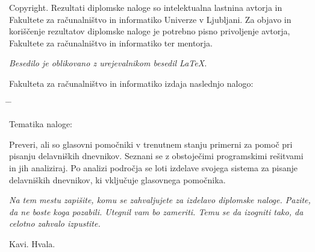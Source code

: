 \documentclass[a4paper, 12pt]{book}
\newcommand{\clearemptydoublepage}{\newpage{\pagestyle{empty}\cleardoublepage}}
\begin{document}
\noindent
{\sc Copyright}. 
Rezultati diplomske naloge so intelektualna lastnina avtorja in Fakultete za računalništvo in informatiko Univerze v Ljubljani.
Za objavo in koriščenje rezultatov diplomske naloge je potrebno pisno privoljenje avtorja, Fakultete za računalništvo in informatiko ter mentorja.

\begin{center}
\mbox{}\vfill
\emph{Besedilo je oblikovano z urejevalnikom besedil \LaTeX.}
\end{center}
\clearemptydoublepage

\thispagestyle{empty}
\vspace*{4cm}

\noindent
Fakulteta za računalništvo in informatiko izdaja naslednjo nalogo:
\medskip
\begin{tabbing}
\hspace{32mm}\= \hspace{6cm} \= \kill




Tematika naloge:
\end{tabbing}
Preveri, ali so glasovni pomočniki v trenutnem stanju primerni za pomoč pri pisanju delavniških dnevnikov.
Seznani se z obstoječimi programskimi rešitvami in jih analiziraj.
Po analizi področja se loti izdelave svojega sistema za pisanje delavniških dnevnikov, ki vključuje glasovnega pomočnika.
\vspace{15mm}



\vspace{2cm}

\clearemptydoublepage

\thispagestyle{empty}\mbox{}\vfill\null\it%
\noindent
Na tem mestu zapišite, komu se zahvaljujete za izdelavo diplomske naloge. Pazite, da ne boste koga pozabili. Utegnil vam bo zameriti. Temu se da izogniti tako, da celotno zahvalo izpustite.
\rm\normalfont

\clearemptydoublepage

\thispagestyle{empty}\mbox{}{\textheight}\mbox{}\hfill\begin{minipage}{0.55\textwidth}%
	Kavi. Hvala.
\normalfont\end{minipage}
\end{document}
